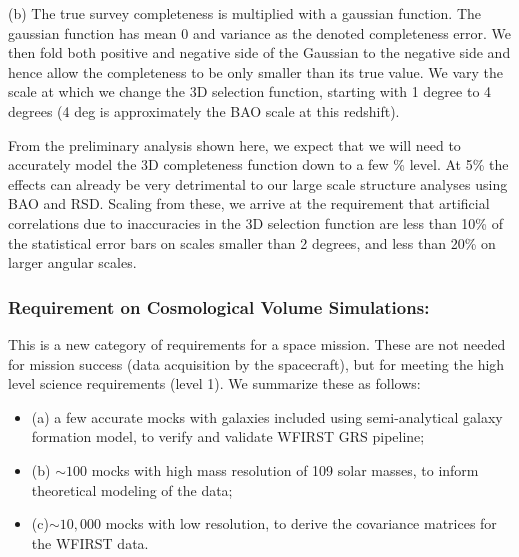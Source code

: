  (b)	The true survey completeness is multiplied with a gaussian function. The
 gaussian function has mean 0 and variance as the denoted completeness error. We
 then fold both positive and negative side of the Gaussian to the negative side
 and hence allow the completeness to be only smaller than its true value. We vary
 the scale at which we change the 3D selection function, starting with 1 degree
 to 4 degrees (4 deg is approximately the BAO scale at this redshift).

 From the preliminary analysis shown here, we expect that we will need to
 accurately model the 3D completeness function down to a few \% level.  At 5\%
 the effects can already be very detrimental to our large scale structure
 analyses using BAO and RSD. Scaling from these, we arrive at the requirement
 that artificial correlations due to inaccuracies in the 3D selection function
 are less than 10\% of the statistical error bars on scales smaller than 2
 degrees, and less than 20\% on larger angular scales.

 \subsubsection{Requirement on Cosmological Volume Simulations:}

 This is a new category of requirements for a space mission. These are not needed
 for mission success (data acquisition by the spacecraft), but for meeting the
 high level science requirements (level 1). We summarize these as follows:

 \begin{itemize}
 \item{(a) a few accurate mocks with galaxies included using semi-analytical
 galaxy formation model, to verify and validate WFIRST GRS pipeline; }
 \item{(b) $\sim 100$ mocks with high mass resolution of 109 solar masses, to inform theoretical
 modeling of the data; }
 \item{(c)$\sim 10,000$ mocks with low resolution, to derive
 the covariance matrices for the WFIRST data.}
 \end{itemize}


